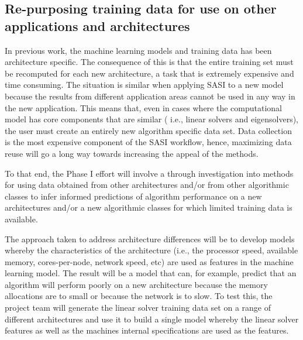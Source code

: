 

\subsection{ Re-purposing training data for use on other applications and architectures }
\label{sec:reuse}
In previous work, the machine learning models and training data has been architecture specific. The consequence of this is that the entire training set must be recomputed for each new architecture, a task that is extremely expensive and time consuming. The situation is similar when applying SASI to a new model because the results from different application areas cannot be used in any way in the new application. This means that, even in cases where the computational model has core components that are similar ( i.e., linear solvers and eigensolvers), the user must create an entirely new algorithm specific data set. Data collection is the most expensive component of the SASI workflow, hence, maximizing data reuse will go a long way towards increasing the appeal of the methods. 

To that end, the Phase I effort will involve a through investigation into methods for using data obtained from other architectures and/or from other algorithmic classes to infer informed predictions of algorithm performance on a new architectures and/or a new algorithmic classes for which limited training data is available. 

The approach taken to address architecture differences will be to develop models whereby the characteristics of the architecture (i.e., the processor speed, available memory, cores-per-node, network speed, etc) are used as features in the machine learning model. The result will be a model that can, for example, predict that an algorithm will perform poorly on a new architecture because the memory allocations are to small or because the network is to slow. To test this, the project team will generate the linear solver training data set on a range of different architectures and use it to build a single model whereby the linear solver features as well as the machines internal specifications are used as the features. 

